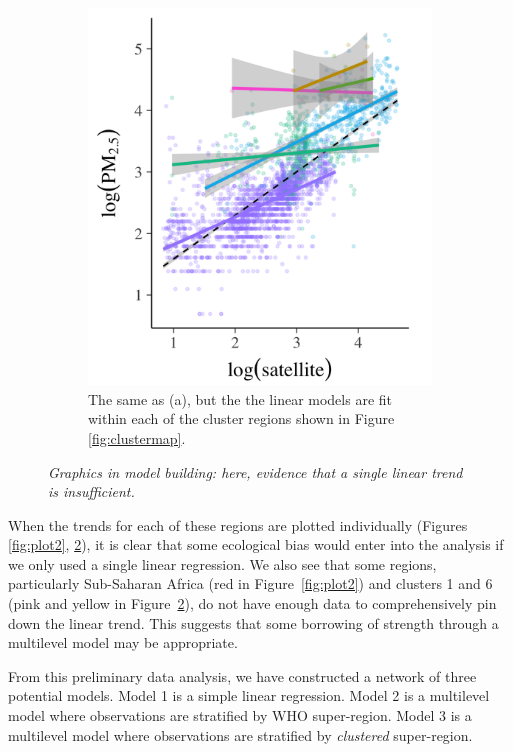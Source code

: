 \documentclass{statsoc}
\begin{document}
\begin{figure}
\begin{subfigure}{0.48\textwidth}
\includegraphics[width=\textwidth]{plot3.png}
\caption{The same as (a), but the the linear models are fit within each of the
cluster regions shown in Figure \ref{fig:clustermap}.}
\label{fig:plot3}
\end{subfigure}

\caption{\it Graphics in model building: here, evidence that a single linear
trend is insufficient.}
\end{figure}

When the trends for each of these regions are plotted individually (Figures
\ref{fig:plot2}, \ref{fig:plot3}), it is clear that some ecological bias would
enter into the analysis if we only used a single linear regression.  We also see
that some regions, particularly Sub-Saharan Africa (red in
Figure~\ref{fig:plot2}) and clusters 1 and 6 (pink and yellow in
Figure~\ref{fig:plot3}), do not have enough data to comprehensively pin down
the linear trend. This suggests that some borrowing of strength through a
multilevel model may be appropriate.

From this preliminary data analysis, we have constructed a network of three
potential models.  Model 1 is a simple linear regression. Model 2 is a
multilevel model where observations are stratified by WHO super-region. Model 3
is a multilevel model where observations are stratified by \emph{clustered}
super-region.
\end{document}
